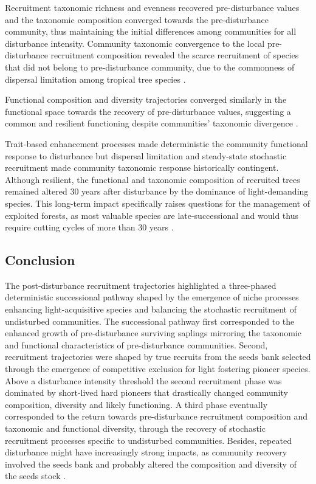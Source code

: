 \documentclass[
  11pt,
  french,
  A4paper,
  extrafontsizes,onecolumn,openright
  ]{memoir}
\begin{document}
Recruitment taxonomic richness and evenness recovered pre-disturbance
values and the taxonomic composition converged towards the
pre-disturbance community, thus maintaining the initial differences
among communities for all disturbance intensity. Community taxonomic
convergence to the local pre-disturbance recruitment composition
revealed the scarce recruitment of species that did not belong to
pre-disturbance community, due to the commonness of dispersal limitation
among tropical tree species \autocite{Svenning2005}.

Functional composition and diversity trajectories converged similarly in
the functional space towards the recovery of pre-disturbance values,
suggesting a common and resilient functioning despite communities'
taxonomic divergence \autocite{Fukami2005}.

Trait-based enhancement processes made deterministic the community
functional response to disturbance but dispersal limitation and
steady-state stochastic recruitment made community taxonomic response
historically contingent. Although resilient, the functional and
taxonomic composition of recruited trees remained altered 30 years after
disturbance by the dominance of light-demanding species. This long-term
impact specifically raises questions for the management of exploited
forests, as most valuable species are late-successional and would thus
require cutting cycles of more than 30 years \autocite{Putz2012}.

\subsection{Conclusion}\label{conclusion-1}

The post-disturbance recruitment trajectories highlighted a three-phased
deterministic successional pathway shaped by the emergence of niche
processes enhancing light-acquisitive species and balancing the
stochastic recruitment of undisturbed communities. The successional
pathway first corresponded to the enhanced growth of pre-disturbance
surviving saplings mirroring the taxonomic and functional
characteristics of pre-disturbance communities. Second, recruitment
trajectories were shaped by true recruits from the seeds bank selected
through the emergence of competitive exclusion for light fostering
pioneer species. Above a disturbance intensity threshold the second
recruitment phase was dominated by short-lived hard pioneers that
drastically changed community composition, diversity and likely
functioning. A third phase eventually corresponded to the return towards
pre-disturbance recruitment composition and taxonomic and functional
diversity, through the recovery of stochastic recruitment processes
specific to undisturbed communities. Besides, repeated disturbance might
have increasingly strong impacts, as community recovery involved the
seeds bank and probably altered the composition and diversity of the
seeds stock \autocite{Norden2009}.
\end{document}

